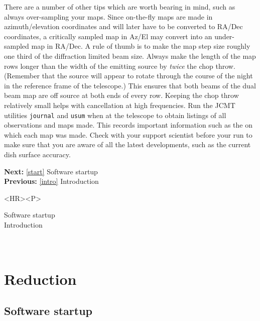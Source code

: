    There are a number of other tips which are worth bearing in mind,
   such as always over-sampling your maps. Since on-the-fly maps are
   made in azimuth/elevation coordinates and will later have to be
   converted to RA/Dec coordinates, a critically sampled map in
   Az/El may convert into an under-sampled map in RA/Dec. A
   rule of thumb is to make the map step size roughly one third of the
   diffraction limited beam size. Always make the length of the map rows
   longer than the width of the emitting source by {\em twice\/} the chop
   throw. (Remember that the source will appear to rotate through the
   course of the night in the reference frame of the telescope.) This
   ensures that both beams of the dual beam map are off source at both
   ends of every row. Keeping the chop throw relatively small helps with
   cancellation at high frequencies. Run the JCMT utilities
   {\tt journal} and
   {\tt usum} when at the telescope to obtain listings of all observations
   and maps made. This records important information such as the
   on which each map was made. Check with your support scientist before
   your run to make sure that you are aware of all the latest
   developments, such as the current dish surface accuracy.

\begin{latexonly}
{\bf Next:} \ref{start} Software startup\\
{\bf Previous:} \ref{intro} Introduction\\
\end{latexonly}

\begin{htmlonly}
\begin{rawhtml} <HR><P> \end{rawhtml}
{\bf {}} Software startup\\
{\bf {}} Introduction\\
{\bf {}}\\
{\bf {}}\\
\end{htmlonly}


\newpage
\section{Reduction}

\subsection{\label{start}Software startup}

